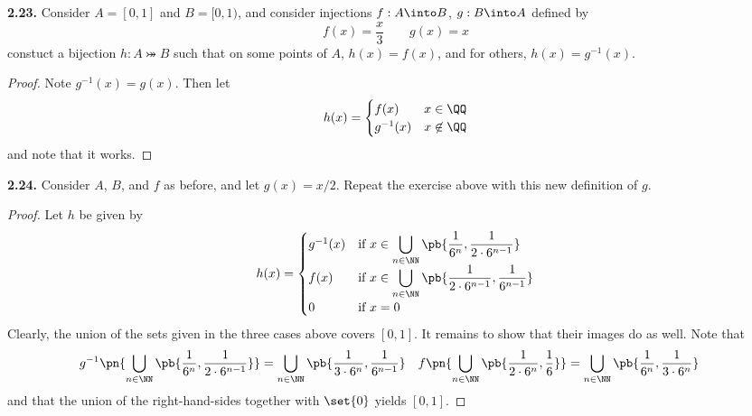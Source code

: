 \documentclass{fkbook}
\newenvironment{problem}[1][Problem \thesection.]
{\begin{boxedminipage}{\linewidth}\textbf{#1.}}
{\end{boxedminipage}}
\begin{document}
\begin{problem}[2.23]
  Consider $A = [0,1]$ and $B = [0,1)$, and consider injections $f : A \into B$,
  $g : B \into A$ defined by
  \[
    f(x) = \frac{x}{3} \qquad g(x) = x
  \]
  constuct a bijection $h : A \bij B$ such that on some points of $A$, $h(x) =
  f(x)$, and for others, $h(x) = g^{-1}(x)$.
\end{problem}
\begin{proof}
  Note $g^{-1}(x) = g(x)$. Then let
  \[
    h(x) =
    \begin{cases}
      f(x) & x \in \QQ \\
      g^{-1}(x) & x \not \in \QQ
    \end{cases}
  \]
  and note that it works.
\end{proof}
\begin{problem}[2.24]
  Consider $A$, $B$, and $f$ as before, and let $g(x) = x/2$. Repeat the
  exercise above with this new definition of $g$.
\end{problem}
\begin{proof}
  Let $h$ be given by
  \[
    h(x) =
    \begin{cases}
      g^{-1}(x) & \displaystyle \text{if } x \in \bigcup_{n \in \NN}
      \pb{\frac{1}{6^{n}}, \frac{1}{2 \cdot 6^{n-1}}} \\
      f(x) & \displaystyle \text{if } x \in \bigcup_{n \in \NN} \pb{\frac{1}{2
          \cdot 6^{n-1}}, \frac{1}{6^{n-1}}} \\
      0 & \text{if } x = 0
    \end{cases}
  \]
  Clearly, the union of the sets given in the three cases above covers $[0,1]$.
  It remains to show that their images do as well. Note that
  \begin{align*}
    g^{-1}\pn{\bigcup_{n \in \NN} \pb{\frac{1}{6^{n}}, \frac{1}{2 \cdot 6^{n-1}}}}
    &= \bigcup_{n \in \NN} \pb{\frac{1}{3 \cdot 6^{n}}, \frac{1}{6^{n-1}}}
    &
      f\pn{\bigcup_{n\in \NN} \pb{\frac{1}{2 \cdot 6^n}, \frac{1}{6}}}
      &= \bigcup_{n \in \NN} \pb{\frac{1}{6^{n}}, \frac{1}{3 \cdot 6^n}}
  \end{align*}
  and that the union of the right-hand-sides together with $\set{0}$ yields
  $[0,1]$.
\end{proof}
\end{document}
